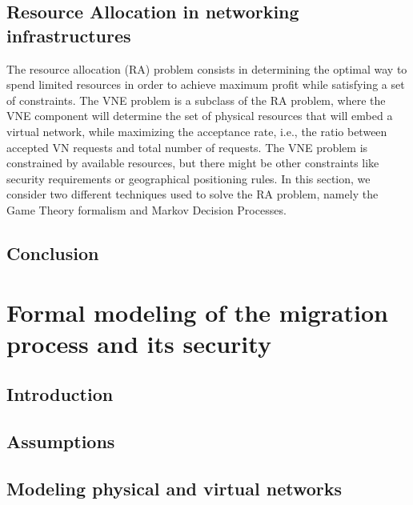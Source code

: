\documentclass[a4paper, 11pt]{article}
\newcommand{\ie}{i.e.,\xspace}
\begin{document}


\newpage
\subsection{Resource Allocation in networking infrastructures}
The resource allocation (RA) problem consists in determining the optimal way to spend limited resources in order to achieve maximum profit while satisfying a set of constraints.
The VNE problem is a subclass of the RA problem, where the VNE component will determine the set of physical resources that will embed a virtual network, while maximizing the acceptance rate, \ie the ratio between accepted VN requests and total number of requests.
The VNE problem is constrained by available resources, but there might be other constraints like security requirements or geographical positioning rules.
In this section, we consider two different techniques used to solve the RA problem, namely the Game Theory formalism and Markov Decision Processes. 

% 



\subsection{Conclusion}


\newpage
\section{Formal modeling of the migration process and its security}
\label{sec:formal_model}
\subsection{Introduction}


% 

\subsection{Assumptions}


\subsection{Modeling physical and virtual networks}

\end{document}

